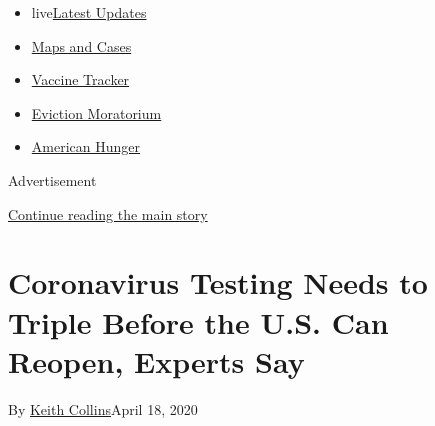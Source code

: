 \begin{itemize}
\tightlist
\item
  live\href{https://www.nytimes3xbfgragh.onion/2020/09/08/world/covid-19-coronavirus.html?name=styln-coronavirus-national\&region=TOP_BANNER\&block=storyline_menu_recirc\&action=click\&pgtype=Interactive\&impression_id=eb4cea11-f1c1-11ea-a22b-e581da043942\&variant=undefined}{Latest
  Updates}
\item
  \href{https://www.nytimes3xbfgragh.onion/interactive/2020/us/coronavirus-us-cases.html?name=styln-coronavirus-national\&region=TOP_BANNER\&block=storyline_menu_recirc\&action=click\&pgtype=Interactive\&impression_id=eb4cea12-f1c1-11ea-a22b-e581da043942\&variant=undefined}{Maps
  and Cases}
\item
  \href{https://www.nytimes3xbfgragh.onion/interactive/2020/science/coronavirus-vaccine-tracker.html?name=styln-coronavirus-national\&region=TOP_BANNER\&block=storyline_menu_recirc\&action=click\&pgtype=Interactive\&impression_id=eb4cea13-f1c1-11ea-a22b-e581da043942\&variant=undefined}{Vaccine
  Tracker}
\item
  \href{https://www.nytimes3xbfgragh.onion/2020/09/02/your-money/eviction-moratorium-covid.html?name=styln-coronavirus-national\&region=TOP_BANNER\&block=storyline_menu_recirc\&action=click\&pgtype=Interactive\&impression_id=eb4cea14-f1c1-11ea-a22b-e581da043942\&variant=undefined}{Eviction
  Moratorium}
\item
  \href{https://www.nytimes3xbfgragh.onion/interactive/2020/09/02/magazine/food-insecurity-hunger-us.html?name=styln-coronavirus-national\&region=TOP_BANNER\&block=storyline_menu_recirc\&action=click\&pgtype=Interactive\&impression_id=eb4cea15-f1c1-11ea-a22b-e581da043942\&variant=undefined}{American
  Hunger}
\end{itemize}

Advertisement

\protect\hyperlink{after-top}{Continue reading the main story}

\hypertarget{coronavirus-testing-needs-to-triple-before-the-us-can-reopen-experts-say}{%
\section{Coronavirus Testing Needs to Triple Before the U.S. Can Reopen,
Experts
Say}\label{coronavirus-testing-needs-to-triple-before-the-us-can-reopen-experts-say}}

By \href{https://www.nytimes3xbfgragh.onion/by/keith-collins}{Keith
Collins}April 18, 2020


